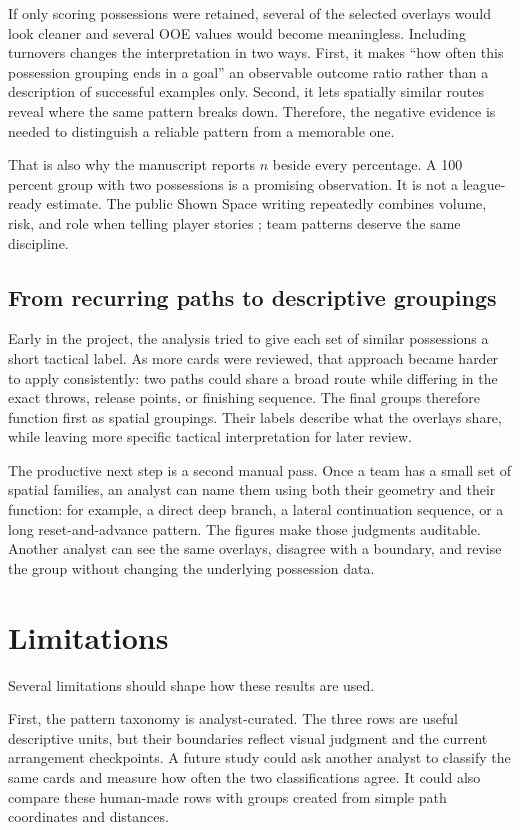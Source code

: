 \documentclass[11pt]{article}
\begin{document}
If only scoring possessions were retained, several of the selected overlays
would look cleaner and several OOE values would become meaningless. Including
turnovers changes the interpretation in two ways. First, it makes ``how often
this possession grouping ends in a goal'' an observable outcome ratio rather
than a description of successful examples only. Second, it lets spatially similar
routes reveal where the same pattern breaks down. Therefore, the negative evidence is needed to distinguish a reliable
pattern from a memorable one.

That is also why the manuscript reports $n$ beside every percentage. A 100
percent group with two possessions is a promising observation. It is not a
league-ready estimate. The public Shown Space writing repeatedly combines
volume, risk, and role when telling player stories
\citep{eberhard2026mvp,eberhard2026decraene}; team patterns deserve the same
discipline.

\subsection{From recurring paths to descriptive groupings}

Early in the project, the analysis tried to give each set of similar possessions
a short tactical label. As more cards were reviewed, that approach became harder
to apply consistently: two paths could share a broad route while differing in
the exact throws, release points, or finishing sequence. The final groups
therefore function first as spatial groupings. Their labels describe what the
overlays share, while leaving more specific tactical interpretation for later
review.

The productive next step is a second manual pass. Once a team has a small set of
spatial families, an analyst can name them using both their geometry and their
function: for example, a direct deep branch, a lateral continuation sequence,
or a long reset-and-advance pattern. The figures make those judgments auditable.
Another analyst can see the same overlays, disagree with a boundary, and revise
the group without changing the underlying possession data.

\section{Limitations}

Several limitations should shape how these results are used.

First, the pattern taxonomy is analyst-curated. The three rows are useful
descriptive units, but their boundaries reflect visual judgment and the current
arrangement checkpoints. A future study could ask another analyst to classify
the same cards and measure how often the two classifications agree. It could
also compare these human-made rows with groups created from simple path
coordinates and distances.
\end{document}

